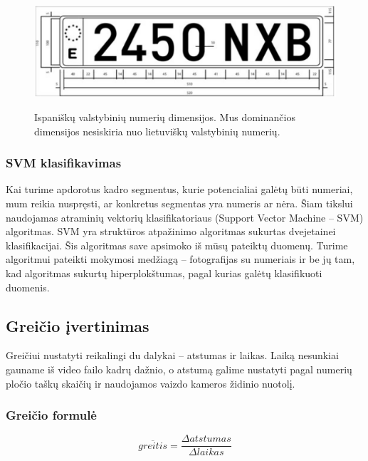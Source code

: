 \documentclass[a4paper,12pt]{article}
\begin{document}
\begin{figure}[h!]
  \caption{Ispaniškų valstybinių numerių dimensijos. Mus dominančios dimensijos nesiskiria nuo lietuviškų valstybinių numerių.}
  \centering
    \includegraphics[width=1\textwidth]{numeriai.png}
  \label{fig:Numeriai}
\end{figure}

\subsubsection{SVM klasifikavimas}
Kai turime apdorotus kadro segmentus, kurie potencialiai galėtų būti numeriai, mum reikia nuspręsti, ar konkretus segmentas yra numeris ar nėra. Šiam tikslui naudojamas atraminių vektorių klasifikatoriaus (Support Vector Machine – SVM) algoritmas. SVM yra struktūros atpažinimo algoritmas sukurtas dvejetainei klasifikacijai. Šis algoritmas save apsimoko iš mūsų pateiktų duomenų. Turime algoritmui pateikti mokymosi medžiagą – fotografijas su numeriais ir be jų tam, kad algoritmas sukurtų hiperplokštumas, pagal kurias galėtų klasifikuoti duomenis.


\subsection{Greičio įvertinimas}
Greičiui nustatyti reikalingi du dalykai – atstumas ir laikas. Laiką nesunkiai gauname iš video failo kadrų dažnio, o atstumą galime nustatyti pagal numerių pločio taškų skaičių ir naudojamos vaizdo kameros židinio nuotolį.


\subsubsection{Greičio formulė}
\begin{equation}
\overline{greitis} = \frac{\Delta atstumas}{\Delta laikas}
\end{equation}
\end{document}
